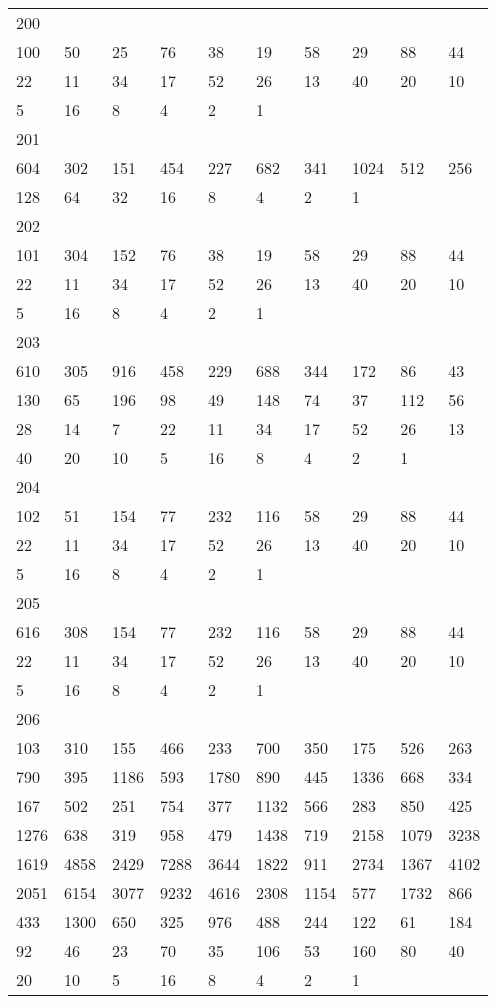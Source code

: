 \begin{longtable}{*{10}{l}}
200&&&&&&&&&\\
100& 50& 25& 76& 38& 19& 58& 29& 88& 44\\
22& 11& 34& 17& 52& 26& 13& 40& 20& 10\\
5& 16& 8& 4& 2& 1& \\

201&&&&&&&&&\\
604& 302& 151& 454& 227& 682& 341& 1024& 512& 256\\
128& 64& 32& 16& 8& 4& 2& 1& \\

202&&&&&&&&&\\
101& 304& 152& 76& 38& 19& 58& 29& 88& 44\\
22& 11& 34& 17& 52& 26& 13& 40& 20& 10\\
5& 16& 8& 4& 2& 1& \\

203&&&&&&&&&\\
610& 305& 916& 458& 229& 688& 344& 172& 86& 43\\
130& 65& 196& 98& 49& 148& 74& 37& 112& 56\\
28& 14& 7& 22& 11& 34& 17& 52& 26& 13\\
40& 20& 10& 5& 16& 8& 4& 2& 1& \\

204&&&&&&&&&\\
102& 51& 154& 77& 232& 116& 58& 29& 88& 44\\
22& 11& 34& 17& 52& 26& 13& 40& 20& 10\\
5& 16& 8& 4& 2& 1& \\

205&&&&&&&&&\\
616& 308& 154& 77& 232& 116& 58& 29& 88& 44\\
22& 11& 34& 17& 52& 26& 13& 40& 20& 10\\
5& 16& 8& 4& 2& 1& \\

206&&&&&&&&&\\
103& 310& 155& 466& 233& 700& 350& 175& 526& 263\\
790& 395& 1186& 593& 1780& 890& 445& 1336& 668& 334\\
167& 502& 251& 754& 377& 1132& 566& 283& 850& 425\\
1276& 638& 319& 958& 479& 1438& 719& 2158& 1079& 3238\\
1619& 4858& 2429& 7288& 3644& 1822& 911& 2734& 1367& 4102\\
2051& 6154& 3077& 9232& 4616& 2308& 1154& 577& 1732& 866\\
433& 1300& 650& 325& 976& 488& 244& 122& 61& 184\\
92& 46& 23& 70& 35& 106& 53& 160& 80& 40\\
20& 10& 5& 16& 8& 4& 2& 1& \\


\end{longtable}
